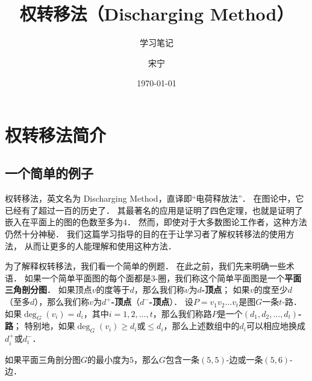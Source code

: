 \documentclass[cn,fancy,blue,11pt]{elegantbook}
\title{权转移法（Discharging Method）}
\subtitle{学习笔记}
\author{宋宁}
\institute{山东理工大学}
\date{\today}
\begin{document}
\newcommand{\setcr}{{\rm CR}}
\newcommand{\nocr}{{\rm cr}}
\newcommand{\mad}{{\rm mad}}
\newenvironment{discharge}{\vskip 10pt\noindent\textbf{\underline{放电规则}}\par}{\par\medskip}


\maketitle

\tableofcontents

\mainmatter
\hypersetup{pageanchor=true}


\chapter{权转移法简介}


\section{一个简单的例子}

权转移法，英文名为 Discharging Method，直译即``电荷释放法''．
在图论中，它已经有了超过一百的历史了．
其最著名的应用是证明了四色定理，也就是证明了嵌入在平面上的图的色数至多为$4$．
然而，即使对于大多数图论工作者，这种方法仍然十分神秘．
我们这篇学习指导的目的在于让学习者了解权转移法的使用方法，
从而让更多的人能理解和使用这种方法．

为了解释权转移法，我们看一个简单的例题．
在此之前，我们先来明确一些术语．
如果一个简单平面图的每个面都是$3$-圈，我们称这个简单平面图是一个\textbf{平面三角剖分图}．
如果顶点$v$的度等于$d$，那么我们称$v$为\textbf{$d$-顶点}；
如果$v$的度至少$d$（至多$d$），那么我们称$v$为\textbf{$d^+$-顶点}（\textbf{$d^-$-顶点}）．
设$P=v_1v_2\dots v_t$是图$G$一条$t$-路．
如果$\deg_G(v_i)=d_i$，其中$i=1,2,\dots,t$，那么我们称路$P$是一个\textbf{$(d_1,d_2,\dots,d_t)$-路}；
特别地，如果$\deg_G(v_i)\ge d_i$或$\le d_i$，那么上述数组中的$d_i$可以相应地换成$d_i^+$或$d_i^-$．

\vskip 10pt
\begin{example}\label{emp:ch-in-1}
	如果平面三角剖分图$G$的最小度为$5$，那么$G$包含一条$(5,5)$-边或一条$(5,6)$-边．
\end{example}
\end{document}
